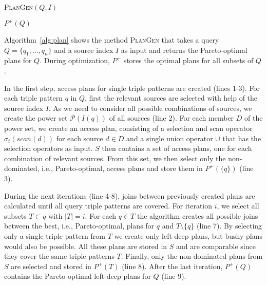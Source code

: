 \begin{algorithm}
  \label{alg:plan}
  \DontPrintSemicolon

  \caption{\textsc{PlanGen}$(Q,I)$}


  \Return $P^+(Q)$
\end{algorithm}

Algorithm~\ref{alg:plan} shows the method \textsc{PlanGen} that takes
a query $Q=\{q_1,\ldots,q_n\}$ and a source index $I$ as input and
returns the Pareto-optimal plans for $Q$. During optimization, $P^+$
stores the optimal plans for all subsets of $Q$.

In the first step, access plans for single triple patterns are created
(lines 1-3). For each triple pattern $q$ in $Q$, first the relevant
sources are selected with help of the source index $I$. As we need to
consider all possible combinations of sources, we create the power set
$\mathcal{P}(I(q))$ of all sources (line 2). For each member $D$ of
the power set, we create an access plan, consisting of a selection and
scan operator $\sigma_t(scan(d))$ for each source $d \in D$ and a
single union operator $\cup$ that has the selection operators as
input. $S$ then contains a set of access plans, one for each
combination of relevant sources. From this set, we then select only
the non-dominated, i.e., Pareto-optimal, access plans and store them
in $P^+(\{q\})$ (line 3).

During the next iterations (line 4-8), joins between previously
created plans are calculated until all query triple patterns are
covered. For iteration $i$, we select all subsets $T \subset q$ with
$|T|=i$. For each $q \in T$ the algorithm creates all possible joins
between the best, i.e., Pareto-optimal, plans for $q$ and $T\setminus
\{q\}$ (line 7). By selecting only a single triple pattern from $T$ we
create only left-deep plans, but bushy plans would also be possible.
All these plans are stored in $S$ and are comparable since they cover
the same triple patterns $T$. Finally, only the non-dominated plans
from $S$ are selected and stored in $P^+(T)$ (line 8). After the last
iteration, $P^+(Q)$ contains the Pareto-optimal left-deep plans for
$Q$ (line 9).


